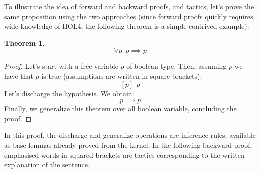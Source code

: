 \documentclass{kththesis}
\newtheorem{theorem}{Theorem}[section]
\begin{document}
To illustrate the idea of forward and backward proofs, and tactics, let's prove the same proposition using the two approaches (since forward proofs quickly requires wide knowledge of HOL4, the following theorem is a simple contrived example).

\begin{theorem}
\begin{equation}
    \forall p.~p \implies p
    \label{hol4-simple-eq-for-proof}
\end{equation}
\end{theorem}

{
\renewcommand*{\proofname}{Forward proof}
\begin{proof}
Let's start with a free variable $p$ of boolean type. Then, assuming $p$ we have that $p$ is true (assumptions are written in square brackets):
$$[p]~~p$$
Let's discharge the hypothesis. We obtain:
$$p \implies p$$
Finally, we generalize this theorem over all boolean variable, concluding the proof.
\end{proof}
}

In this proof, the discharge and generalize operations are inference rules, available as base lemmas already proved from the kernel. In the following backward proof, emphasised words in squared brackets are tactics corresponding to the written explanation of the sentence.
\end{document}
